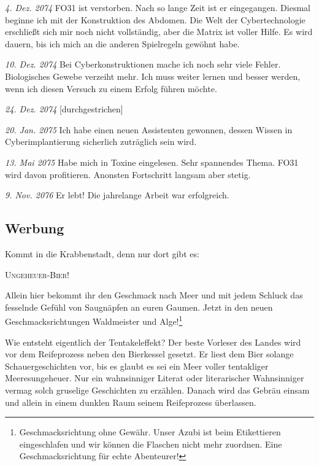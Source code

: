 \documentclass[final]{multiversum}
\begin{document}
\noindent\textit{4. Dez. 2074} FO31 ist verstorben. Nach so lange Zeit ist er eingegangen. Diesmal beginne ich mit der Konstruktion des Abdomen. Die Welt der Cybertechnologie erschließt sich mir noch nicht vollständig, aber die Matrix ist voller Hilfe. Es wird dauern, bis ich mich an die anderen Spielregeln gewöhnt habe.

\noindent\textit{10. Dez. 2074} Bei Cyberkonstruktionen mache ich noch sehr viele Fehler. Biologisches Gewebe verzeiht mehr. Ich muss weiter lernen und besser werden, wenn ich diesen Versuch zu einem Erfolg führen möchte.

\noindent\textit{24. Dez. 2074} [durchgestrichen]

\noindent\textit{20. Jan. 2075} Ich habe einen neuen Assistenten gewonnen, dessen Wissen in Cyberimplantierung sicherlich zuträglich sein wird.

\noindent\textit{13. Mai 2075} Habe mich in Toxine eingelesen. Sehr spannendes Thema. FO31 wird davon profitieren. Anonsten Fortschritt langsam aber stetig. 

\noindent\textit{9. Nov. 2076} Er lebt! Die jahrelange Arbeit war erfolgreich.

\subsection{Werbung}
Kommt in die Krabbenstadt, denn nur dort  gibt es:

\vspace{0.7em}
\centerline{\textsc{Ungeheuer-Bier!}}
\vspace{0.7em}

\noindent Allein hier bekommt ihr den Geschmack nach Meer und mit jedem Schluck das fesselnde Gefühl von Saugnäpfen an euren Gaumen.
Jetzt in den neuen Geschmacksrichtungen Waldmeister und Alge!\footnote{Geschmacksrichtung ohne Gewähr. Unser Azubi ist beim Etikettieren eingeschlafen und wir können die Flaschen nicht mehr zuordnen. Eine Geschmacksrichtung für echte Abenteurer!}

Wie entsteht eigentlich der Tentakeleffekt?
Der beste Vorleser des Landes wird vor dem Reifeprozess neben den Bierkessel gesetzt.
Er liest dem Bier solange Schauergeschichten vor, bis es glaubt es sei ein Meer voller tentakliger Meeresungeheuer. 
Nur ein wahnsinniger Literat oder literarischer Wahnsinniger vermag solch gruselige Geschichten zu erzählen.
Danach wird das Gebräu einsam und allein in einem dunklen Raum seinem Reifeprozess überlassen.
\end{document}
